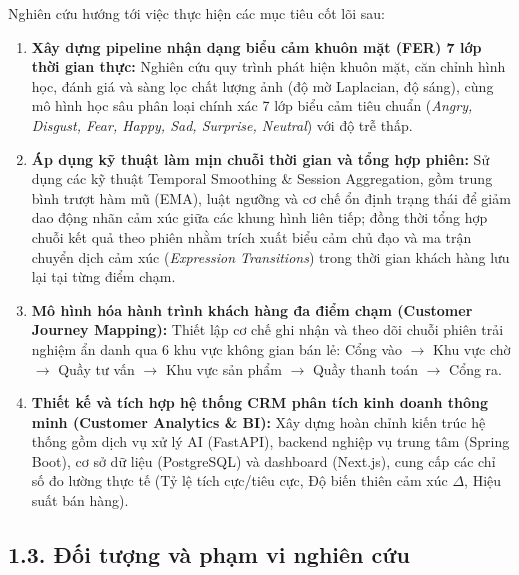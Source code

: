 Nghiên cứu hướng tới việc thực hiện các mục tiêu cốt lõi sau:
\begin{enumerate}
    \item \textbf{Xây dựng pipeline nhận dạng biểu cảm khuôn mặt (FER) 7 lớp thời gian thực:} Nghiên cứu quy trình phát hiện khuôn mặt, căn chỉnh hình học, đánh giá và sàng lọc chất lượng ảnh (độ mờ Laplacian, độ sáng), cùng mô hình học sâu phân loại chính xác 7 lớp biểu cảm tiêu chuẩn (\textit{Angry, Disgust, Fear, Happy, Sad, Surprise, Neutral}) với độ trễ thấp.
    \item \textbf{Áp dụng kỹ thuật làm mịn chuỗi thời gian và tổng hợp phiên:} Sử dụng các kỹ thuật Temporal Smoothing \& Session Aggregation, gồm trung bình trượt hàm mũ (EMA), luật ngưỡng và cơ chế ổn định trạng thái để giảm dao động nhãn cảm xúc giữa các khung hình liên tiếp; đồng thời tổng hợp chuỗi kết quả theo phiên nhằm trích xuất biểu cảm chủ đạo và ma trận chuyển dịch cảm xúc (\textit{Expression Transitions}) trong thời gian khách hàng lưu lại tại từng điểm chạm.
    \item \textbf{Mô hình hóa hành trình khách hàng đa điểm chạm (Customer Journey Mapping):} Thiết lập cơ chế ghi nhận và theo dõi chuỗi phiên trải nghiệm ẩn danh qua 6 khu vực không gian bán lẻ: Cổng vào $\rightarrow$ Khu vực chờ $\rightarrow$ Quầy tư vấn $\rightarrow$ Khu vực sản phẩm $\rightarrow$ Quầy thanh toán $\rightarrow$ Cổng ra.
    \item \textbf{Thiết kế và tích hợp hệ thống CRM phân tích kinh doanh thông minh (Customer Analytics \& BI):} Xây dựng hoàn chỉnh kiến trúc hệ thống gồm dịch vụ xử lý AI (FastAPI), backend nghiệp vụ trung tâm (Spring Boot), cơ sở dữ liệu (PostgreSQL) và dashboard (Next.js), cung cấp các chỉ số đo lường thực tế (Tỷ lệ tích cực/tiêu cực, Độ biến thiên cảm xúc $\Delta$, Hiệu suất bán hàng).
\end{enumerate}

\subsection*{1.3. Đối tượng và phạm vi nghiên cứu}

